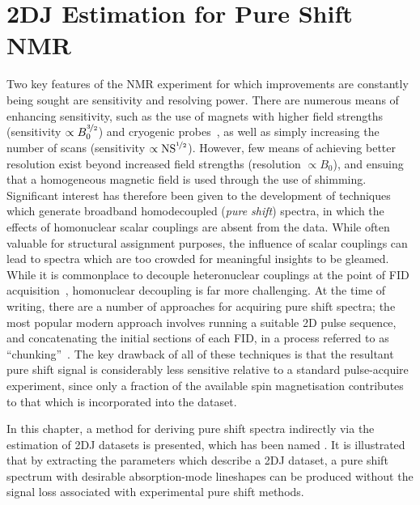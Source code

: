 \chapter{2DJ Estimation for Pure Shift NMR}
\label{chap:cupid}
Two key features of the \ac{NMR} experiment for which improvements are
constantly being sought are sensitivity and resolving power. There are numerous
means of enhancing sensitivity, such as the use of magnets with higher field
strengths~\cite{Maeda2019} (sensitivity $\propto B_0^{\nicefrac{3}{2}}$) and
cryogenic probes~\cite{Kovacs2020}, as well as simply
increasing the number of scans (sensitivity $\propto
\operatorname{NS}^{\nicefrac{1}{2}}$).
However, few means of achieving better resolution exist beyond increased field
strengths (resolution $\propto B_0$), and ensuing that a homogeneous magnetic
field is used through the use of shimming. Significant interest has therefore
been given to the development of techniques which generate broadband homodecoupled
(\emph{pure shift}) spectra, in which the effects of homonuclear scalar
couplings are absent from the data. While often valuable for structural
assignment purposes, the influence of scalar couplings can lead to spectra
which are too crowded for meaningful insights to be gleamed. While it is
commonplace to decouple heteronuclear couplings at the point of \ac{FID}
acquisition~\cite{Shaka1983a, Shaka1983b,Shaka1985}, homonuclear decoupling is
far more challenging. At the time of writing, there are a number of approaches
for acquiring pure shift spectra; the most popular modern approach
involves running a suitable \ac{2D} pulse sequence, and concatenating the initial
sections of each \ac{FID}, in a process referred to as
``chunking''~\cite{Meyer2013,Adams2014,Zangger2015}. The key drawback of all of
these techniques is that the resultant pure shift signal is considerably less
sensitive relative to a standard pulse-acquire experiment, since only a
fraction of the available spin magnetisation contributes to that which is
incorporated into the dataset.

In this chapter, a method for deriving pure shift spectra indirectly via the
estimation of \ac{2DJ} datasets is presented, which has been named
. It is illustrated that by extracting the parameters which
describe a \ac{2DJ} dataset, a pure shift spectrum with desirable
absorption-mode lineshapes can be produced without the signal loss associated
with experimental pure shift methods.





